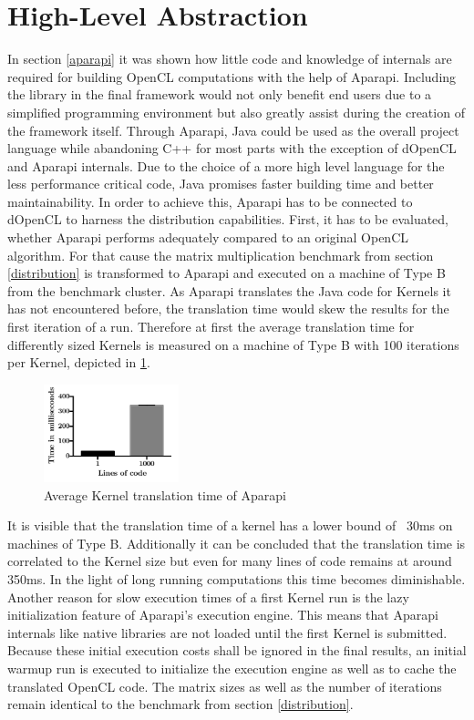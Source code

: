 \section{High-Level Abstraction}
\label{abstraction}

In section \ref{aparapi} it was shown how little code and knowledge of internals are required for building OpenCL computations with the help of Aparapi. Including the library in the final framework would not only benefit end users due to a simplified programming environment but also greatly assist during the creation of the framework itself. Through Aparapi, Java could be used as the overall project language while abandoning C++ for most parts with the exception of dOpenCL and Aparapi internals. Due to the choice of a more high level language for the less performance critical code, Java promises faster building time and better maintainability. In order to achieve this, Aparapi has to be connected to dOpenCL to harness the distribution capabilities. First, it has to be evaluated, whether Aparapi performs adequately compared to an original OpenCL algorithm. For that cause the matrix multiplication benchmark from section \ref{distribution} is transformed to Aparapi and executed on a machine of Type B from the benchmark cluster. As Aparapi translates the Java code for Kernels it has not encountered before, the translation time would skew the results for the first iteration of a run. Therefore at first the average translation time for differently sized Kernels is measured on a machine of Type B with 100 iterations per Kernel, depicted in \ref{img:aparapi_translation}.

\begin{figure}[H]
	\includegraphics[width=0.35\textwidth]{images/aparapi_translation.pdf}
	\centering
	\caption{Average Kernel translation time of Aparapi}
	\label{img:aparapi_translation}
\end{figure}

It is visible that the translation time of a kernel has a lower bound of ~30ms on machines of Type B. Additionally it can be concluded that the translation time is correlated to the Kernel size but even for many lines of code remains at around 350ms. In the light of long running computations this time becomes diminishable. Another reason for slow execution times of a first Kernel run is the lazy initialization feature of Aparapi's execution engine. This means that Aparapi internals like native libraries are not loaded until the first Kernel is submitted. Because these initial execution costs shall be ignored in the final results, an initial warmup run is executed to initialize the execution engine as well as to cache the translated OpenCL code. The matrix sizes as well as the number of iterations remain identical to the benchmark from section \ref{distribution}.

